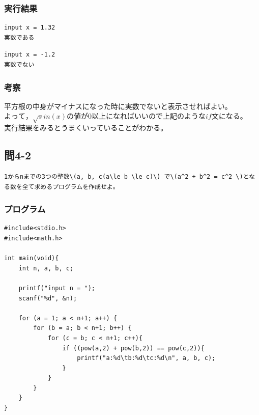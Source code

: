 \documentclass{jarticle}
\begin{document}
\subsubsection{実行結果\\}
\begin{breakbox}
\begin{verbatim}
input x = 1.32
実数である
\end{verbatim}
\end{breakbox}
\begin{breakbox}
\begin{verbatim}
input x = -1.2
実数でない
\end{verbatim}
\end{breakbox}
\subsubsection{考察\\}
平方根の中身がマイナスになった時に実数でないと表示させればよい。\\
$よって，\sqrt sin(x) の値が0以上になればいいので上記のようなif文になる。$\\
実行結果をみるとうまくいっていることがわかる。\\


\subsection{問4-2\\}
\begin{verbatim}
1からnまでの3つの整数\(a, b, c(a\le b \le c)\) で\(a^2 + b^2 = c^2 \)となる数を全て求めるプログラムを作成せよ。
\end{verbatim}
\subsubsection{プログラム\\}
\begin{breakbox}
\begin{verbatim}
#include<stdio.h>
#include<math.h>

int main(void){
    int n, a, b, c;

    printf("input n = ");
    scanf("%d", &n);

    for (a = 1; a < n+1; a++) {
        for (b = a; b < n+1; b++) {
            for (c = b; c < n+1; c++){
                if ((pow(a,2) + pow(b,2)) == pow(c,2)){
                    printf("a:%d\tb:%d\tc:%d\n", a, b, c);
                }
            }
        }
    }   
}
\end{verbatim}
\end{breakbox}
\end{document}

